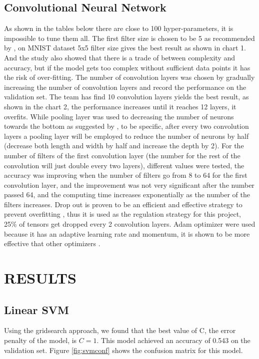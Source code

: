 \documentclass[letterpaper, 10 pt, conference]{ieeeconf}  %
\begin{document}
\subsection{Convolutional Neural Network}
As shown in the tables below there are close to 100 hyper-parameters, it is impossible to tune them all. The first filter size is chosen to be 5 as recommended by \cite{dhingra2017model}, on MNIST dataset 5x5 filter size gives the best result as shown in chart 1. And the study also showed that there is a trade of between complexity and accuracy, but if the model gets too complex without sufficient data points it has the risk of over-fitting. The number of convolution layers was chosen by gradually increasing the number of convolution layers and record the performance on the validation set. The team has find 10 convolution layers yields the best result, as shown in the chart 2, the performance increases until it reaches 12 layers, it overfits. While pooling layer was used to decreasing the number of neurons towards the bottom as suggested by \cite{lattner2016}, to be specific, after every two convolution layers a pooling layer will be employed to reduce the number of neurons by half (decrease both length and width by half and increase the depth by 2). For the number of filters of the first convolution layer (the number for the rest of the convolution will just double every two layers), different values were tested, the accuracy was improving when the number of filters go from 8 to 64 for the first convolution layer, and the improvement was not very significant after the number passed 64, and the computing time increases exponentially as the number of the filters increases. Drop out is proven to be an efficient and effective strategy to prevent overfitting \cite{srivastava2014dropout}, thus it is used as the regulation strategy for this project, 25\% of tensors get dropped every 2 convolution layers. Adam optimizer were used because it has an adaptive learning rate and momentum, it is shown to be more effective that other optimizers \cite{walia2017opt}.

\section{RESULTS}

\subsection{Linear SVM}
Using the gridsearch approach, we found that the best value of C, the error penalty of the model, is $C=1$. This model achieved an accuracy of 0.543 on the validation set. Figure \ref{fig:svmconf} shows the confusion matrix for this model.
\end{document}
